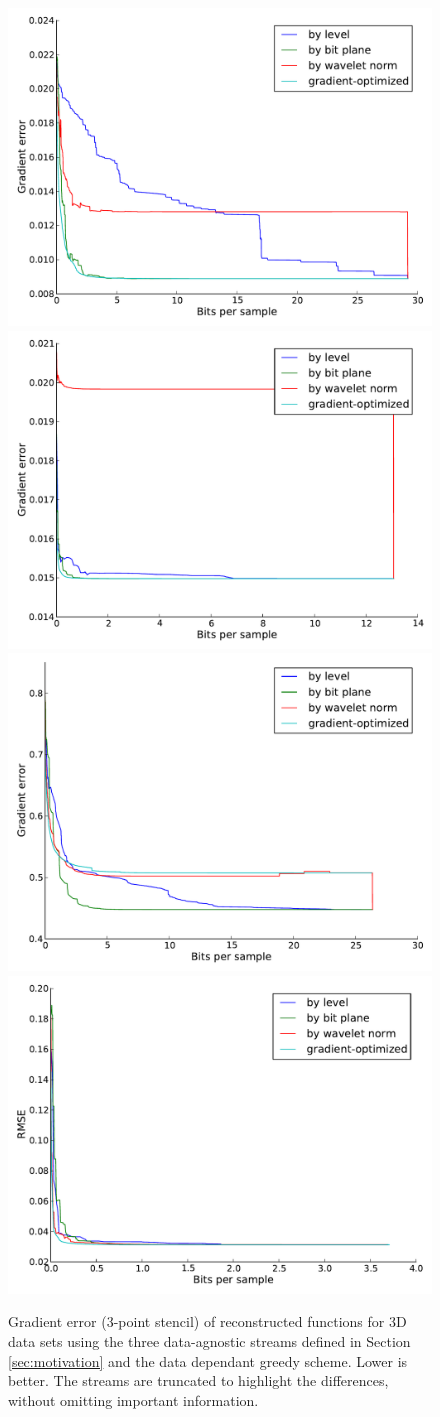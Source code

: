 \begin{figure}
  \centering
        {\includegraphics[width=0.48\linewidth]{img/motivation-3d/gradient-boiler.pdf}}
 	{\includegraphics[width=0.48\linewidth]{img/motivation-3d/gradient-diffusivity.pdf}}
 	{\includegraphics[width=0.48\linewidth]{img/motivation-3d/gradient-turbulence.pdf}}
 	{\includegraphics[width=0.48\linewidth]{img/motivation-3d/gradient-velocityz.pdf}}
 	\caption{Gradient error (3-point stencil) of reconstructed functions for 3D data sets using the three data-agnostic streams
 	defined in Section \ref{sec:motivation} and the data dependant greedy scheme. Lower is better.
        The streams are truncated to highlight
 	the differences, without omitting important information.}
 	\label{fig:motivation-3d-gradient}
\end{figure}

